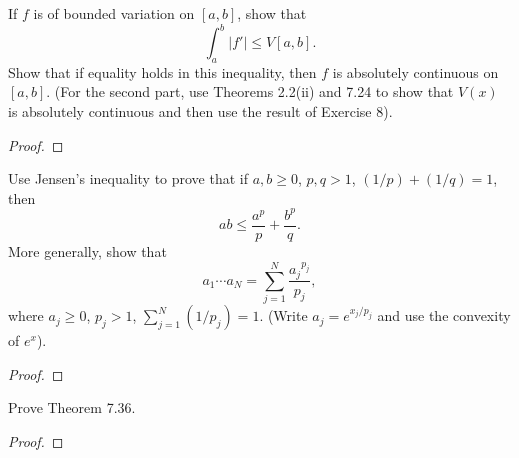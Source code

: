 \begin{problem}
If $f$ is of bounded variation on $[a,b]$, show that
\[
\int_a^b|f'|\leq V[a,b].
\]
Show that if equality holds in this inequality, then $f$ is absolutely
continuous on $[a,b]$. (For the second part, use Theorems 2.2(ii) and 7.24
to show that $V(x)$ is absolutely continuous and then use the result of
Exercise 8).
\end{problem}
\begin{proof}
\end{proof}
\newpage

\begin{problem}
Use Jensen's inequality to prove that if $a,b\geq 0$, $p,q>1$,
$(1/p)+(1/q)=1$, then
\[
ab\leq\frac{a^p}{p}+\frac{b^p}{q}.
\]
More generally, show that
\[
a_1\dotsm a_N=\sum_{j=1}^N\frac{{a_j}^{p_j}}{p_j},
\]
where $a_j\geq 0$, $p_j>1$, $\sum_{j=1}^N(1/p_j)=1$. (Write
$a_j=e^{x_j/p_j}$ and use the convexity of $e^x$).
\end{problem}
\begin{proof}
\end{proof}
\newpage

\begin{problem}
Prove Theorem 7.36.
\end{problem}
\begin{proof}
\end{proof}


